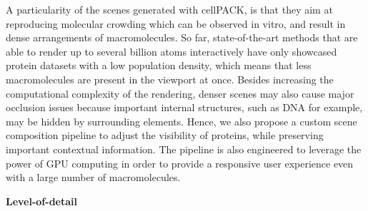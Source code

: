 A particularity of the scenes generated with cellPACK, is that they aim at reproducing molecular crowding which can be observed in vitro, and result in dense arrangements of macromolecules.
So far, state-of-the-art methods that are able to render up to several billion atoms interactively have only showcased protein datasets with a low population density, which means that less macromolecules are present in the viewport at once.
Besides increasing the computational complexity of the rendering, denser scenes may also cause major occlusion issues because important internal structures, such as DNA for example, may be hidden by surrounding elements.
Hence, we also propose a custom scene composition pipeline to adjust the visibility of proteins, while preserving important contextual information.
The pipeline is also engineered to leverage the power of GPU computing in order to provide a responsive user experience even with a large number of macromolecules.

\textbf{Level-of-detail}

